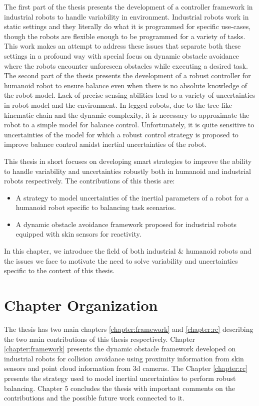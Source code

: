 \documentclass[a4paper,11pt,twoside]{StyleThese}
\begin{document}
The first part of the thesis presents the development of a controller framework in industrial robots to handle variability in environment. Industrial robots work in static settings and they literally do what it is programmed for specific use-cases, though the robots are flexible enough to be programmed for a variety of tasks. This work makes an attempt to address these issues that separate both these settings in a profound way with special focus on dynamic obstacle avoidance where the robots encounter unforeseen obstacles while executing a desired task. 
The second part of the thesis presents the development of a robust controller for humanoid robot to ensure balance even when there is no absolute knowledge of the robot model. Lack of precise sensing abilities lead to a variety of uncertainties in robot model and the environment. In legged robots, due to the tree-like kinematic chain and the dynamic complexity, it is necessary to approximate the robot to a simple model for balance control. Unfortunately, it is quite sensitive to uncertainties of the model for which a robust control strategy is proposed to improve balance control amidst inertial uncertainties of the robot.

This thesis in short focuses on developing smart strategies to improve the ability to handle variability and uncertainties robustly both in humanoid and industrial robots respectively. The contributions of this thesis are:
\begin{itemize}
    \item A strategy to model uncertainties of the inertial parameters of a robot for a humanoid robot specific to balancing task scenarios.
    \item A dynamic obstacle avoidance framework proposed for industrial robots equipped with skin sensors for reactivity. 
\end{itemize}

In this chapter, we introduce the field of both industrial \& humanoid robots and the issues we face to motivate the need to solve variability and uncertainties specific to the context of this thesis. 




\section{Chapter Organization}
The thesis has two main chapters \ref{chapter:framework} and \ref{chapter:rc} describing the two main contributions of this thesis respectively. Chapter \ref{chapter:framework} presents the dynamic obstacle framework developed on industrial robots for collision avoidance using proximity information from skin sensors and point cloud information from 3d cameras. The Chapter \ref{chapter:rc} presents the strategy used to model inertial uncertainties to perform robust balancing. Chapter 5 concludes the thesis with important comments on the contributions and the possible future work connected to it.
\end{document}
